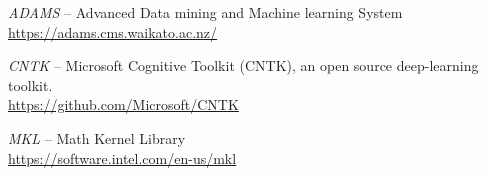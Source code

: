 %

\begin{thebibliography}{999}

		\textit{ADAMS} -- Advanced Data mining and Machine learning System \\
		\url{https://adams.cms.waikato.ac.nz/}{}
		
                \textit{CNTK} -- Microsoft Cognitive Toolkit (CNTK), an open
                source deep-learning toolkit. \\
		\url{https://github.com/Microsoft/CNTK}{}

		\textit{MKL} -- Math Kernel Library \\
		\url{https://software.intel.com/en-us/mkl}{}

\end{thebibliography}
